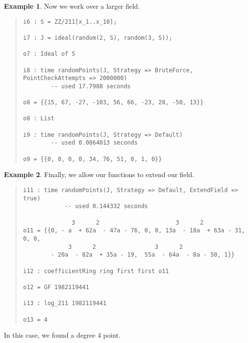 \documentclass[11pt]{amsart}
\theoremstyle{definition}
\newtheorem{example}{Example}[section]
\begin{document}
\begin{example}
    Now we work over a larger field.
    {{\small\color{blue}
    \begin{quote}
\begin{verbatim}
i6 : S = ZZ/211[x_1..x_10];

i7 : J = ideal(random(2, S), random(3, S));

o7 : Ideal of S

i8 : time randomPoints(J, Strategy => BruteForce, PointCheckAttempts => 2000000)
        -- used 17.7988 seconds
                   
o8 = {{15, 67, -27, -103, 56, 66, -23, 28, -50, 13}}

o8 : List

i9 : time randomPoints(J, Strategy => Default)
        -- used 0.0864013 seconds         

o9 = {{0, 0, 0, 0, 34, 76, 51, 0, 1, 0}}
    \end{verbatim}
\end{quote}\vspace{-2em}
        }}
    \end{example}

\begin{example}
        Finally, we allow our functions to extend our field.
        {{\small\color{blue}
        \begin{quote}
            {\small
\begin{verbatim}
i11 : time randomPoints(J, Strategy => Default, ExtendField => true)
            -- used 0.144332 seconds              
       
              3      2                      3      2                        
o11 = {{0, - a  + 62a  - 47a - 76, 0, 0, 13a  - 18a  + 63a - 31, 0, 0, 
             3      2                 3      2
        - 20a  - 82a  + 35a - 19,  55a  - 64a  - 8a - 50, 1}}

i12 : coefficientRing ring first first o11

o12 = GF 1982119441       

i13 : log_211 1982119441

o13 = 4
\end{verbatim}
            }
    \end{quote}
        }}
In this case, we found a degree 4 point.
    \end{example}
\end{document}
